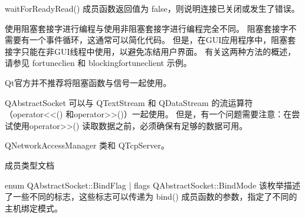 waitForReadyRead() 成员函数返回值为 false，则说明连接已关闭或发生了错误。

使用阻塞套接字进行编程与使用非阻塞套接字进行编程完全不同。 阻塞套接字不需要有一个事件循环，这通常可以简化代码。 但是，在GUI应用程序中，阻塞套接字只能在非GUI线程中使用，以避免冻结用户界面。 有关这两种方法的概述，请参见 fortuneclien 和 blockingfortuneclient 示例。

\begin{notice}
Qt官方并不推荐将阻塞函数与信号一起使用。
\end{notice}


QAbstractSocket 可以与 QTextStream 和 QDataStream 的流运算符（operator<<() 和operator>>()）一起使用。 但是，有一个问题需要注意：在尝试使用operator>>() 读取数据之前，必须确保有足够的数据可用。

\begin{seeAlso}
QNetworkAccessManager 类和 QTcpServer。
\end{seeAlso}

\splitLine

成员类型文档

enum QAbstractSocket::BindFlag | flags QAbstractSocket::BindMode
该枚举描述了一些不同的标志，这些标志可以传递为 bind() 成员函数的参数，指定了不同的主机绑定模式。

